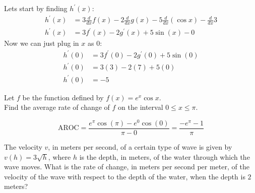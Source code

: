 \documentclass[12pt,letterpaper, onecolumn]{exam}
\begin{document}
\begin{questions}
	
    \begin{solution}
	Lets start by finding $h^\prime(x)$:
	\begin{align*}
		h^\prime(x) &= 3 \frac{d}{dx} f(x) - 2 \frac{d}{dx} g(x) - 5 \frac {d}{dx} (\cos x) - \frac {d}{dx} 3 \\
		h^\prime(x) &= 3f^\prime(x) - 2g^\prime(x) + 5\sin (x) - 0
	\end{align*}
	Now we can just plug in $x$ as $0$:
	\begin{align*}
		h^\prime(0) &= 3f^\prime(0) - 2g^\prime(0) + 5\sin (0) \\
		h^\prime(0) &= 3(3) - 2(7) + 5(0) \\
		h^\prime(0) &= \boxed{-5}
	\end{align*}
    \end{solution}

\pagebreak

\question Let $f$ be the function defined by $f(x) = e^{x} \cos x$. \\ Find the average rate of change of $f$ on the interval $ 0 \leq x \leq \pi $.

	\begin{solution}
		$$\text{AROC} = \frac{e^{\pi} \cos(\pi) - e^{0} \cos(0)}{\pi - 0} = \boxed{\frac{-e^{\pi}-1}{\pi}}$$
	\end{solution}

\pagebreak

\question The velocity $v$, in meters per second, of a certain type of wave is given by $v(h) = 3\sqrt{h}$, where $h$ is the depth, in meters, of the water through which the wave moves. What is the rate of change, in meters per second per meter, of the velocity of the wave with respect to the depth of the water, when the depth is $2$ meters?


\end{questions}
\end{document}
